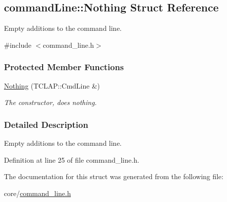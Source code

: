 \hypertarget{structcommandLine_1_1Nothing}{}\subsection{command\+Line\+:\+:Nothing Struct Reference}
\label{structcommandLine_1_1Nothing}


Empty additions to the command line.  




{\ttfamily \#include $<$command\+\_\+line.\+h$>$}

\subsubsection*{Protected Member Functions}
\begin{DoxyCompactItemize}
\item 
\hyperlink{structcommandLine_1_1Nothing_a5af39f594af1981bb676f72e224e5ea7}{Nothing} (T\+C\+L\+A\+P\+::\+Cmd\+Line \&)\hypertarget{structcommandLine_1_1Nothing_a5af39f594af1981bb676f72e224e5ea7}{}\label{structcommandLine_1_1Nothing_a5af39f594af1981bb676f72e224e5ea7}

\begin{DoxyCompactList}\small\item\em The constructor, does nothing. \end{DoxyCompactList}\end{DoxyCompactItemize}


\subsubsection{Detailed Description}
Empty additions to the command line. 

Definition at line 25 of file command\+\_\+line.\+h.



The documentation for this struct was generated from the following file\+:\begin{DoxyCompactItemize}
\item 
core/\hyperlink{command__line_8h}{command\+\_\+line.\+h}\end{DoxyCompactItemize}
